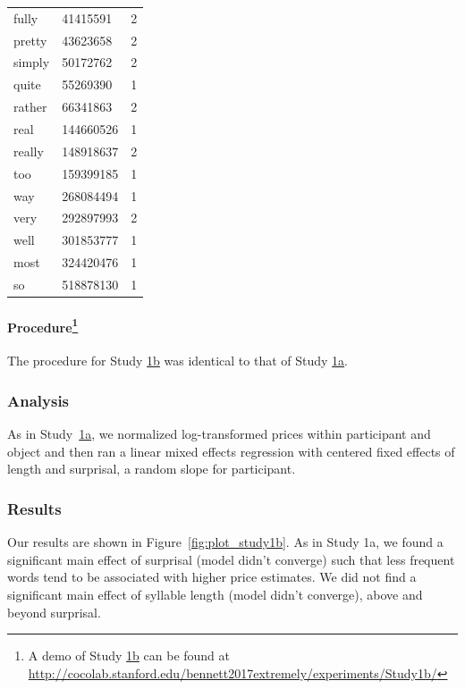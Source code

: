 \documentclass[10pt,letterpaper]{article}
\newcommand{\todo}[1]{{\color{red}#1}}
\begin{document}
\begin{table}[ht]
\begin{center}
\begin{tabular}{llc}
    fully & 41415591 & 2 \\ 
    pretty & 43623658 & 2 \\ 
    simply & 50172762 & 2 \\ 
    quite & 55269390 & 1 \\ 
    rather & 66341863 & 2 \\ 
    real & 144660526 & 1 \\ 
    really & 148918637 & 2 \\ 
    too & 159399185 & 1 \\ 
    way & 268084494 & 1 \\ 
    very & 292897993 & 2 \\ 
    well & 301853777 & 1 \\ 
    most & 324420476 & 1 \\ 
    so & 518878130 & 1
  \end{tabular}
 \end{center}
\end{table}

\paragraph{Procedure\footnote{A demo of Study \hyperref[sec:study1b]{1b} can be found at \url{http://cocolab.stanford.edu/bennett2017extremely/experiments/Study1b/}}}

The procedure for Study \hyperref[sec:study1b]{1b} was identical to that of Study \hyperref[sec:study1a]{1a}.


\subsubsection{Analysis}

As in Study~\hyperref[sec:study1a]{1a}, we normalized log-transformed prices within participant and object and then ran a linear mixed effects regression with centered fixed effects of length and surprisal, a random slope for participant.

\subsubsection{Results}

Our results are shown in Figure~\ref{fig:plot_study1b}. 
As in Study 1a, we found a significant main effect of surprisal (\todo{model didn't converge}) such that less frequent words tend to be associated with higher price estimates.
We did not find a significant main effect of syllable length (\todo{model didn't converge}), above and beyond surprisal.
\end{document}
